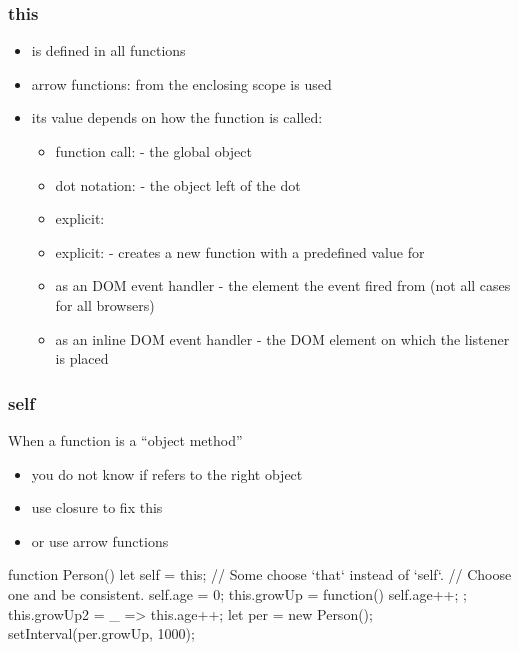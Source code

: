 \begin{frame}[fragile] \frametitle{this}
\begin{itemize}
  \item {} is defined in all functions
  \item arrow functions:  from the enclosing scope is used
  \item its value depends on how the function is called:
  \begin{itemize}
    \item function call:  - the global object
    \item dot notation:  - the object left of the dot
    \item explicit: 
    \item explicit:  - creates a new function with a predefined value for 
    \item as an DOM event handler - the element the event fired from (not all cases for all browsers)
    \item as an inline DOM event handler - the DOM element on which the listener is placed
  \end{itemize}
\end{itemize}
\end{frame}

\begin{frame}[fragile] \frametitle{self}
When a function is a ``object method''
\begin{itemize}
  \item you do not know if  refers to the right object
  \item use closure to fix this
  \item or use arrow functions
\end{itemize}
\begin{CodeBox}{}
function Person() {
  let self = this; // Some choose `that` instead of `self`. 
                         // Choose one and be consistent.
  self.age = 0;
  this.growUp = function() { self.age++; };
  this.growUp2 = _ =>  this.age++;
}
let per = new Person();
setInterval(per.growUp, 1000);
\end{CodeBox}
\end{frame}

